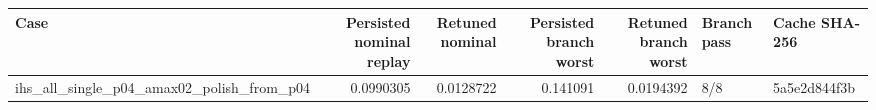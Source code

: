 \begin{tabular}{lrrrrll}
\toprule
Case & Persisted nominal replay & Retuned nominal & Persisted branch worst & Retuned branch worst & Branch pass & Cache SHA-256 \\
\midrule
ihs\_all\_single\_p04\_amax02\_polish\_from\_p04 & 0.0990305 & 0.0128722 & 0.141091 & 0.0194392 & 8/8 & 5a5e2d844f3b \\
\bottomrule
\end{tabular}
